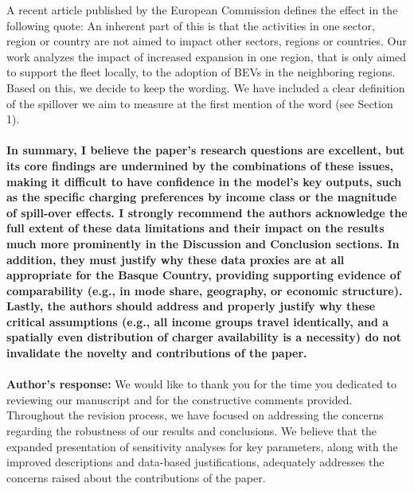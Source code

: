 \documentclass[11pt]{article}
\begin{document}
A recent article published by the European Commission defines the  effect in the following quote:  An inherent part of this is that the activities in one sector, region or country are not aimed to impact other sectors, regions or countries. Our work analyzes the impact of increased expansion in one region, that is only aimed to support the fleet locally, to the adoption of BEVs in the neighboring regions. Based on this, we decide to keep the wording. We have included a clear definition of the spillover we aim to measure at the first mention of the word (see Section 1). \\\\
\color{reviewergrey}
\textbf{In summary, I believe the paper's research questions are excellent, but its core findings are undermined by the combinations of these issues, making it difficult to have confidence in the model's key outputs, such as the specific charging preferences by income class or the magnitude of spill-over effects. I strongly recommend the authors acknowledge the full extent of these data limitations and their impact on the results much more prominently in the Discussion and Conclusion sections. In addition, they must justify why these data proxies are at all appropriate for the Basque Country, providing supporting evidence of comparability (e.g., in mode share, geography, or economic structure). Lastly, the authors should address and properly justify why these critical assumptions (e.g., all income groups travel identically, and a spatially even distribution of charger availability is a necessity) do not invalidate the novelty and contributions of the paper. } \\\\
\color{authorblue}
\noindent \textcolor{authorblue}{\textbf{Author's response:}} We would like to thank you for the time you dedicated to reviewing our manuscript and for the constructive comments provided. Throughout the revision process, we have focused on addressing the concerns regarding the robustness of our results and conclusions. We believe that the expanded presentation of sensitivity analyses for key parameters, along with the improved descriptions and data-based justifications, adequately addresses the concerns raised about the contributions of the paper.

\color{black}
\newpage
{}


\end{document}
